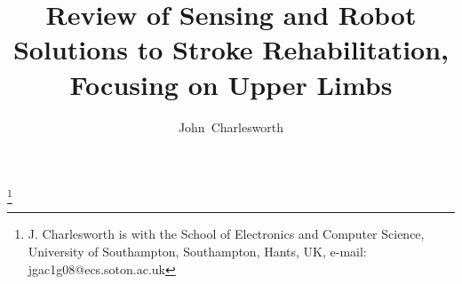 \documentclass[journal]{IEEEtran}
\begin{document}
%
\title{Review of Sensing and Robot Solutions to Stroke Rehabilitation, Focusing on Upper Limbs} %
%
%
%

\author{John~Charlesworth}%
\thanks{J. Charlesworth is with the School of Electronics and Computer Science, 
University of Southampton, Southampton, Hants,
UK, e-mail: jgac1g08@ecs.soton.ac.uk}%


% 
%





% 
\end{document}
